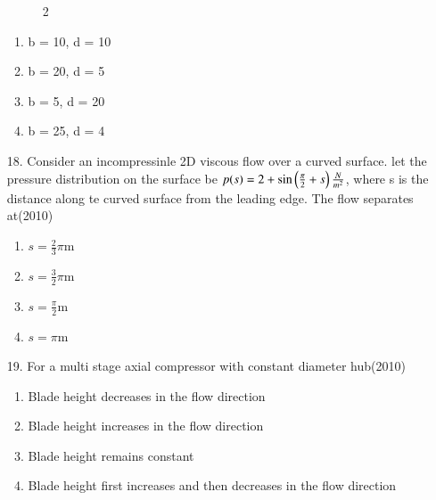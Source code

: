 \documentclass[journal]{IEEEtran}
\begin{document}
\begin{enumerate}
 \begin{figure}[!ht]
    \centering
    \caption{2}
    \label{fig:2}
\end{figure}
 \begin{enumerate}[label=(\Alph*)]
    \item b = 10, d = 10
    \item b = 20, d = 5
    \item b = 5, d = 20
    \item b = 25, d = 4
 \end{enumerate}
 \item[18.] Consider an incompressinle 2D viscous flow over a curved surface. let the pressure distribution on the surface be $p(s) = 2 + \sin\left(\frac{\pi}{2}+s\right)\frac{N}{m^2}$, where s is the distance along te curved surface from the leading edge. The flow separates at\hfill (2010)
 \begin{enumerate}[label=(\Alph*)]
    \item $s=\frac{2}{3}\pi$m
    \item $s=\frac{3}{2}\pi$m
    \item $s=\frac{\pi}{2}$m
    \item $s=\pi$m
 \end{enumerate}
 \item[19.] For a multi stage axial compressor with constant diameter hub\hfill (2010)
 \begin{enumerate}[label=(\Alph*)]
    \item Blade height decreases in the flow direction
    \item Blade height increases in the flow direction
    \item Blade height remains constant
    \item Blade height first increases and then decreases in the flow direction
 \end{enumerate}

\end{enumerate}
\end{document}
